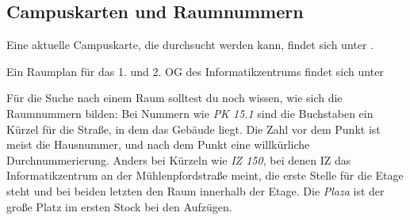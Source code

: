 
\subsection{Campuskarten und Raumnummern}
\label{campuskarte}
Eine aktuelle Campuskarte, die durchsucht werden kann, findet sich unter .

Ein Raumplan für das 1. und 2. OG des Informatikzentrums findet sich
unter 


Für die Suche nach einem Raum solltest du noch wissen, wie sich die Raumnummern bilden: Bei Nummern wie \textit{PK 15.1} sind die Buchstaben ein Kürzel für die Straße, in dem das Gebäude liegt. Die Zahl vor dem Punkt ist meist die Hausnummer, und nach dem Punkt eine willkürliche Durchnummerierung. Anders bei Kürzeln wie \textit{IZ 150}, bei denen IZ das Informatikzentrum an der Mühlenpfordstraße meint, die erste Stelle für die Etage steht und bei beiden letzten den Raum innerhalb der Etage. Die \textit{Plaza} ist der große Platz im ersten Stock bei den Aufzügen.

